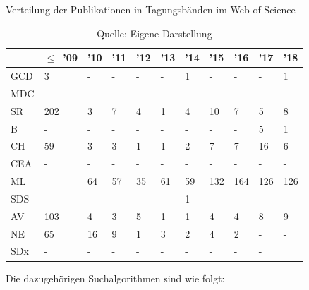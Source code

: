 \begin{table}
\caption{Verteilung der Publikationen in Tagungsbänden im \glqq Web of Science\grqq}
\centering
\label{tab:dist_wos_proc}
\begin{tabularx}{\linewidth}{X|X|X|X|X|X|X|X|X|X|X}
	& $\leq$~'09 & '10 & '11 & '12 & '13 & '14 & '15 & '16 & '17 & '18 \\
	\hline
	GCD & 3 & - & - & - & - & 1 & - & - & - & 1 \\
	\hline
	MDC & - & - & - & - & - & - & - & - & - & - \\
	\hline
	SR & 202 & 3 & 7 & 4 & 1 & 4 & 10 & 7 & 5 & 8 \\
	\hline
	B & - & - & - & - & - & - & - & - & 5 & 1 \\
	\hline
	CH & 59 & 3 & 3 & 1 & 1 & 2 & 7 & 7 & 16 & 6 \\
	\hline
	CEA & - & - & - & - & - & - & - & - & - & - \\
	\hline
	ML & \numprint{2042} & 64 & 57 & 35 & 61 & 59 & 132 & 164 & 126 & 126 \\
	\hline
	SDS & - & - & - & - & - & 1 & - & - & - & - \\
	\hline
	AV & 103 & 4 & 3 & 5 & 1 & 1 & 4 & 4 & 8 & 9 \\
	\hline
	NE & 65 & 16 & 9 & 1 & 3 & 2 & 4 & 2 & - & - \\
	\hline
	SDx & - & - & - & - & - & - & - & - & - & \\
\end{tabularx}
\caption*{Quelle: Eigene Darstellung}
\end{table}

Die dazugehörigen Suchalgorithmen sind wie folgt:

